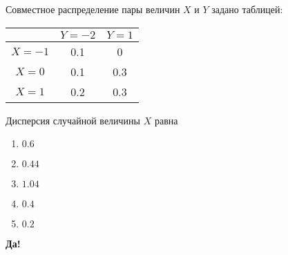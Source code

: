 \documentclass[t]{beamer}
\begin{document}
 \begin{frame} \label{15-Yes} 
\begin{block}{15} 

Совместное распределение пары величин $X$ и $Y$ задано таблицей:

\begin{center}
\begin{tabular}{c|cc}
 & $Y=-2$ & $Y=1$ \\
\hline
$X=-1$ & 0.1 & 0 \\
$X=0$ & 0.1 & 0.3 \\
$X=1$ & 0.2 & 0.3 \\
\end{tabular}
\end{center}
\vspace{0.2cm} 
 
 Дисперсия случайной величины $X$ равна
 


 \end{block} 
\begin{enumerate} 
\item[] \hyperlink{15-No}{\beamergotobutton{} $0.6$}
\item[] \hyperlink{15-Yes}{\beamergotobutton{} $0.44$}
\item[] \hyperlink{15-No}{\beamergotobutton{} $1.04$
}
\item[] \hyperlink{15-No}{\beamergotobutton{} $0.4$}
\item[] \hyperlink{15-No}{\beamergotobutton{} $0.2$}
\end{enumerate} 

 \textbf{Да!} 
 \hyperlink{16}{}\end{frame} 
\end{document}
